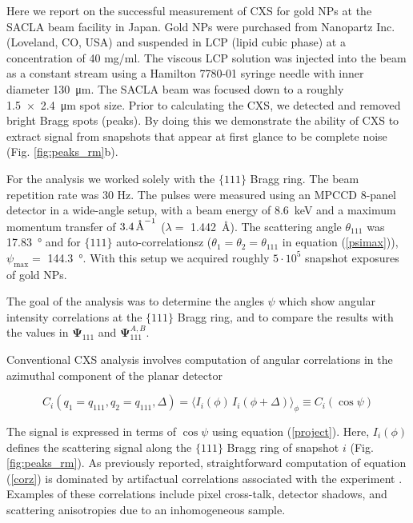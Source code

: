 \documentclass [12pt,fleqn]{article}
\newcommand{\angstrom}{\textup{\AA}}
\def \be {\begin{equation}}
\def \ee {\end{equation}}
\begin{document}
\cite{misquitta2003detergents}

Here we report on the successful measurement of CXS for gold NPs at the SACLA beam facility in Japan. Gold NPs were purchased from Nanopartz Inc. (Loveland, CO, USA) and suspended in LCP (lipid cubic phase) \cite{ai2000membrane, cheng1998simple, caffrey2009crystallizing, misquitta2003detergents} at a concentration of 40 mg/ml. The viscous LCP solution was injected into the beam as a constant stream using a Hamilton 7780-01 syringe needle with inner diameter \SI{130}{\micro \meter}. The SACLA beam was focused down to a roughly \SI{1.5x2.4}{\micro \meter} spot size. Prior to calculating the CXS, we detected and removed bright Bragg spots (peaks). By doing this we demonstrate the ability of CXS to extract signal from snapshots that appear at first glance to be complete noise (Fig. \ref{fig:peaks_rm}b).

For the analysis we worked solely with the $\{111\}$ Bragg ring. The beam repetition rate was 30 Hz. The pulses were measured using an MPCCD 8-panel detector in a wide-angle setup, with a beam energy of \SI{8.6}{\kilo \electronvolt} and a maximum momentum transfer of $3.4 \, \angstrom^{-1}$ ($\lambda = $ \SI{1.442}{\angstrom}). The scattering angle $\theta_{111}$ was \SI{17.83}{\degree} and for $\{111\}$ auto-correlationsz ($\theta_1 = \theta_2 = \theta_{111}$ in equation (\ref{psimax})), $\psi_{\max} =$ \SI{144.3}{\degree}. With this setup we acquired roughly $5 \cdot 10^5$ snapshot exposures of gold NPs. 

The goal of the analysis was to determine the angles $\psi$ which show angular intensity correlations at the $\{111\}$ Bragg ring, and to compare the results with the values in $\bm {\Psi}_{111}$ and $\bm \Psi^{A,B}_{111}$.

Conventional CXS analysis involves computation of angular correlations in the azimuthal component of the planar detector

\be \label{corz}
C_i (q_1=q_{111}, q_2=q_{111}, \Delta) = \big \langle I_i (\phi)\, I_i( \phi+\Delta) \big \rangle _{\phi} \equiv C_i(\cos \psi)
\ee

The signal is expressed in terms of  $\cos \psi $ using equation (\ref{project}). Here, $I_i(\phi)$ defines the scattering signal along the $\{111\}$ Bragg ring of snapshot $i$ (Fig. \ref{fig:peaks_rm}). As previously reported, straightforward computation of equation (\ref{corz}) is dominated by artifactual correlations associated with the experiment \cite{mendez2014observation}. Examples of these correlations include pixel cross-talk, detector shadows, and scattering anisotropies due to an inhomogeneous sample. 
\end{document}
